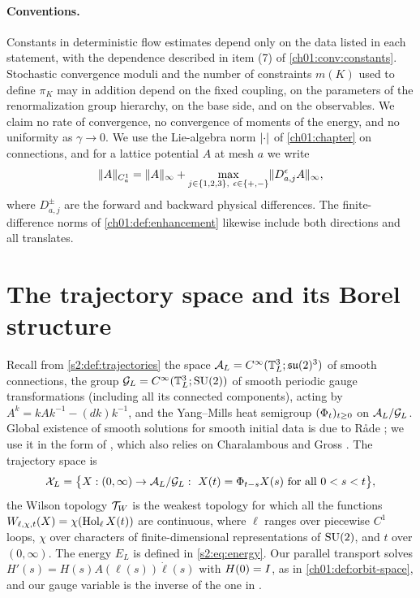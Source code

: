 \paragraph{Conventions.}
Constants in deterministic flow estimates depend only on the data listed in each statement, with the dependence described in item (7) of \cref{ch01:conv:constants}. Stochastic convergence moduli and the number of constraints $m(K)$ used to define $\pi_K$ may in addition depend on the fixed coupling, on the parameters of the renormalization group hierarchy, on the base side, and on the observables. We claim no rate of convergence, no convergence of moments of the energy, and no uniformity as $\gamma\to0$. We use the Lie-algebra norm $\lvert \cdot\rvert$ of \cref{ch01:chapter} on connections, and for a lattice potential $A$ at mesh $a$ we write
\[
 \lVert A\rVert_{C_a^1}=\lVert A\rVert_\infty+\max_{j\in\{1,2,3\},\ \epsilon\in\{+,-\}}\lVert D_{a,j}^\epsilon A\rVert_\infty,
\]
where $D_{a,j}^\pm$ are the forward and backward physical differences. The finite-difference norms of \cref{ch01:def:enhancement} likewise include both directions and all translates.

\section{The trajectory space and its Borel structure}\label{ch26:sec:trajectory-space}

Recall from \cref{s2:def:trajectories} the space $\mathcal A_L=C^\infty(\mathbb T_L^3;\mathfrak{su}(2)^3)$ of smooth connections, the group $\mathcal G_L=C^\infty(\mathbb T_L^3;\mathrm{SU}(2))$ of smooth periodic gauge transformations (including all its connected components), acting by $A^k=kAk^{-1}-(dk)k^{-1}$, and the Yang--Mills heat semigroup $(\Phi_t)_{t\ge0}$ on $\mathcal A_L/\mathcal G_L$. Global existence of smooth solutions for smooth initial data is due to R\aa de \cite{Rade1992}; we use it in the form of \cite[Theorem 3.14, p.~25]{CCState2023v4}, which also relies on Charalambous and Gross \cite{CharalambousGross2013}. The trajectory space is
\[
 \OrbitSpace=\bigl\{X:(0,\infty)\to\SpaceA/\SpaceG:\ X(t)=\Flowcov_{t-s}X(s)\text{ for all }0<s<t\bigr\},
\]
the Wilson topology $\mathcal T_W$ is the weakest topology for which all the functions $W_{\ell,\chi,t}(X)=\chi(\operatorname{Hol}_\ell X(t))$ are continuous, where $\ell$ ranges over piecewise $C^1$ loops, $\chi$ over characters of finite-dimensional representations of $\mathrm{SU}(2)$, and $t$ over $(0,\infty)$. The energy $E_L$ is defined in \eqref{s2:eq:energy}. Our parallel transport solves $H'(s)=H(s)A(\ell(s))\dot\ell(s)$ with $H(0)=I$, as in \cref{ch01:def:orbit-space}, and our gauge variable is the inverse of the one in \cite[(1.1), p.~2]{CCState2023v4}.

